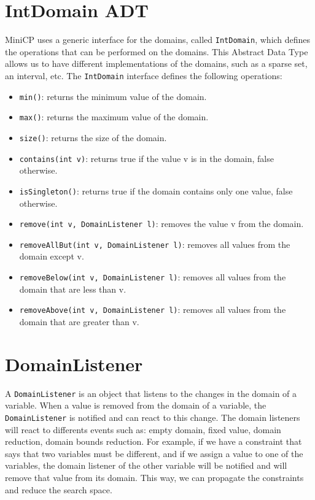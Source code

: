 \documentclass[12pt, openany]{report}
\theoremstyle{definition}
\begin{document}
\section{IntDomain ADT}
MiniCP uses a generic interface for the domains, called \texttt{IntDomain}, which defines the operations that can be performed on the domains. This Abstract Data Type allows us to have different implementations of the domains, such as a sparse set, an interval, etc. The \texttt{IntDomain} interface defines the following operations:
\begin{itemize}
    \item \texttt{min()}: returns the minimum value of the domain.
    \item \texttt{max()}: returns the maximum value of the domain.
    \item \texttt{size()}: returns the size of the domain.
    \item \texttt{contains(int v)}: returns true if the value v is in the domain, false otherwise.
    \item \texttt{isSingleton()}: returns true if the domain contains only one value, false otherwise.
    \item \texttt{remove(int v, DomainListener l)}: removes the value v from the domain.
    \item \texttt{removeAllBut(int v, DomainListener l)}: removes all values from the domain except v.
    \item \texttt{removeBelow(int v, DomainListener l)}: removes all values from the domain that are less than v.
    \item \texttt{removeAbove(int v, DomainListener l)}: removes all values from the domain that are greater than v.
\end{itemize}
\section{DomainListener}
A \texttt{DomainListener} is an object that listens to the changes in the domain of a variable. When a value is removed from the domain of a variable, the \texttt{DomainListener} is notified and can react to this change. The domain listeners will react to differents events such as: empty domain, fixed value, domain reduction, domain bounds reduction. For example, if we have a constraint that says that two variables must be different, and if we assign a value to one of the variables, the domain listener of the other variable will be notified and will remove that value from its domain. This way, we can propagate the constraints and reduce the search space.
\end{document}
